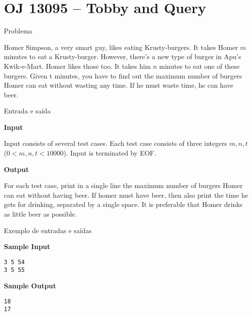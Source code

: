 \section{OJ 13095 -- Tobby and Query}

\begin{frame}[fragile]{Problema}

Homer Simpson, a very smart guy, likes eating Krusty-burgers. It takes Homer $m$ minutes to eat a
Krusty-burger. However, there’s a new type of burger in Apu’s Kwik-e-Mart. Homer likes those too.
It takes him $n$ minutes to eat one of these burgers. Given t minutes, you have to find out the
maximum number of burgers Homer can eat without wasting any time. If he must waste time, he can
have beer.

\end{frame}

\begin{frame}[fragile]{Entrada e saída}

\textbf{Input}

Input consists of several test cases. Each test case consists of three integers $m, n, t$ ($0 < m,
n, t < 10000$). Input is terminated by EOF.

\vspace{0.2in}

\textbf{Output}

For each test case, print in a single line the maximum number of burgers Homer can eat without
having beer. If homer must have beer, then also print the time he gets for drinking, separated by
a single space. It is preferable that Homer drinks as little beer as possible.

\end{frame}

\begin{frame}[fragile]{Exemplo de entradas e saídas}

\begin{minipage}[t]{0.45\textwidth}
\textbf{Sample Input}
\begin{verbatim}
3 5 54
3 5 55
\end{verbatim}
\end{minipage}
\begin{minipage}[t]{0.5\textwidth}
\textbf{Sample Output}
\begin{verbatim}
18
17
\end{verbatim}
\end{minipage}
\end{frame}

